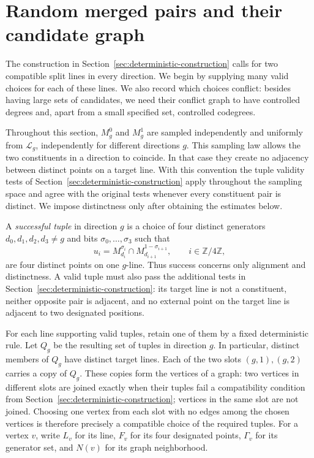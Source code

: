 \section{Random merged pairs and their candidate graph}\label{sec:candidates}

The construction in Section~\ref{sec:deterministic-construction} calls for
two compatible split lines in every direction. We begin by supplying many
valid choices for each of these lines. We also record which choices
conflict: besides having large sets of candidates, we need their conflict
graph to have controlled degrees and, apart from a small specified set,
controlled codegrees.

Throughout this section, $M_g^0$ and $M_g^1$ are sampled independently and
uniformly from $\mathcal L_g$, independently for different directions
$g$. This sampling law allows the two constituents in a direction to
coincide. In that case they create no adjacency between distinct points
on a target line. With this convention the tuple validity tests of
Section~\ref{sec:deterministic-construction} apply throughout the sampling
space and agree with the original tests whenever every constituent pair
is distinct. We impose distinctness only after obtaining the estimates
below.

A \emph{successful tuple} in direction $g$ is a choice of four distinct
generators $d_0,d_1,d_2,d_3\ne g$ and bits
$\sigma_0,\ldots,\sigma_3$ such that
\[
 u_i=M_{d_i}^{\sigma_i}\cap M_{d_{i+1}}^{1-\sigma_{i+1}},
 \qquad i\in\mathbb Z/4\mathbb Z,
\]
are four distinct points on one $g$-line. Thus success concerns only
alignment and distinctness. A valid tuple must also pass the additional
tests in Section~\ref{sec:deterministic-construction}: its target line is
not a constituent, neither opposite pair is adjacent, and no external
point on the target line is adjacent to two designated positions.

For each line supporting valid tuples, retain one of them by a fixed
deterministic rule. Let $Q_g$ be the resulting set of tuples in direction
$g$. In particular, distinct members of $Q_g$ have distinct target lines.
Each of the two slots $(g,1),(g,2)$ carries a copy of $Q_g$. These copies
form the vertices of a graph: two vertices in different slots are joined
exactly when their tuples fail a compatibility condition from
Section~\ref{sec:deterministic-construction}; vertices in the same slot
are not joined. Choosing one vertex from each slot with no edges among
the chosen vertices is therefore precisely a compatible choice of the
required tuples. For a vertex $v$, write $L_v$ for its line, $F_v$ for its
four designated points, $\Gamma_v$ for its generator set, and $N(v)$ for
its graph neighborhood.

